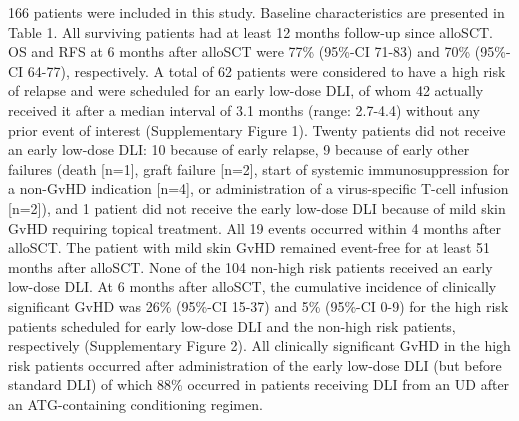 \documentclass[
  letterpaper,
  DIV=11,
  numbers=noendperiod]{scrreprt}
\begin{document}
166 patients were included in this study. Baseline characteristics are
presented in Table 1. All surviving patients had at least 12 months
follow-up since alloSCT. OS and RFS at 6 months after alloSCT were 77\%
(95\%-CI 71-83) and 70\% (95\%-CI 64-77), respectively. A total of 62
patients were considered to have a high risk of relapse and were
scheduled for an early low-dose DLI, of whom 42 actually received it
after a median interval of 3.1 months (range: 2.7-4.4) without any prior
event of interest (Supplementary Figure 1). Twenty patients did not
receive an early low-dose DLI: 10 because of early relapse, 9 because of
early other failures (death {[}n=1{]}, graft failure {[}n=2{]}, start of
systemic immunosuppression for a non-GvHD indication {[}n=4{]}, or
administration of a virus-specific T-cell infusion {[}n=2{]}), and 1
patient did not receive the early low-dose DLI because of mild skin GvHD
requiring topical treatment. All 19 events occurred within 4 months
after alloSCT. The patient with mild skin GvHD remained event-free for
at least 51 months after alloSCT. None of the 104 non-high risk patients
received an early low-dose DLI. At 6 months after alloSCT, the
cumulative incidence of clinically significant GvHD was 26\% (95\%-CI
15-37) and 5\% (95\%-CI 0-9) for the high risk patients scheduled for
early low-dose DLI and the non-high risk patients, respectively
(Supplementary Figure 2). All clinically significant GvHD in the high
risk patients occurred after administration of the early low-dose DLI
(but before standard DLI) of which 88\% occurred in patients receiving
DLI from an UD after an ATG-containing conditioning regimen.

\begingroup\fontsize{9}{11}\selectfont
\end{document}
